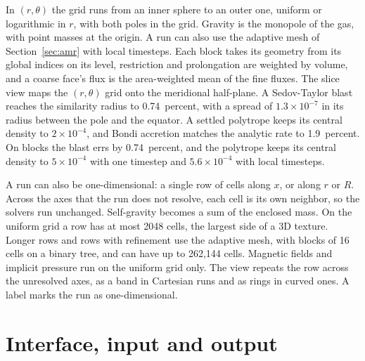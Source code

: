 \documentclass[twocolumn]{aastex701}
\begin{document}
In $(r, \theta)$ the grid runs from an inner sphere to an outer one, uniform or logarithmic in $r$, with both poles in the grid. Gravity is the monopole of the gas, with point masses at the origin. A run can also use the adaptive mesh of Section~\ref{sec:amr} with local timesteps. Each block takes its geometry from its global indices on its level, restriction and prolongation are weighted by volume, and a coarse face's flux is the area-weighted mean of the fine fluxes. The slice view maps the $(r, \theta)$ grid onto the meridional half-plane. A Sedov-Taylor blast reaches the similarity radius to 0.74~percent, with a spread of $1.3\times10^{-7}$ in its radius between the pole and the equator. A settled polytrope keeps its central density to $2\times10^{-4}$, and Bondi accretion matches the analytic rate to 1.9~percent. On blocks the blast errs by 0.74~percent, and the polytrope keeps its central density to $5\times10^{-4}$ with one timestep and $5.6\times10^{-4}$ with local timesteps.

A run can also be one-dimensional: a single row of cells along $x$, or along $r$ or $R$. Across the axes that the run does not resolve, each cell is its own neighbor, so the solvers run unchanged. Self-gravity becomes a sum of the enclosed mass. On the uniform grid a row has at most 2048 cells, the largest side of a 3D texture. Longer rows and rows with refinement use the adaptive mesh, with blocks of 16 cells on a binary tree, and can have up to 262,144 cells. Magnetic fields and implicit pressure run on the uniform grid only. The view repeats the row across the unresolved axes, as a band in Cartesian runs and as rings in curved ones. A label marks the run as one-dimensional.

\section{Interface, input and output}
\label{sec:interface}
\end{document}
